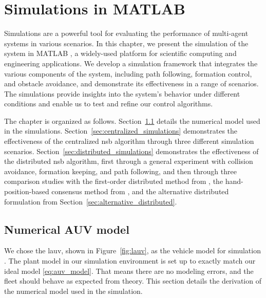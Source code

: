 \chapter{Simulations in MATLAB}\label{cha:sim_matlab}
Simulations are a powerful tool for evaluating the performance of multi-agent systems in various scenarios. In this chapter, we present the simulation of the system in MATLAB \citep{matlab_2022}, a widely-used platform for scientific computing and engineering applications. We develop a simulation framework that integrates the various components of the system, including path following, formation control, and obstacle avoidance, and demonstrate its effectiveness in a range of scenarios. The simulations provide insights into the system's behavior under different conditions and enable us to test and refine our control algorithms. 


The chapter is organized as follows. Section~\ref{sec:numerical_auv} details the numerical model used in the simulations. Section~\ref{sec:centralized_simulations} demonstrates the effectiveness of the centralized \gls{nsb} algorithm through three different simulation scenarios. Section~\ref{sec:distributed_simulations} demonstrates the effectiveness of the distributed \gls{nsb} algorithm, first through a general experiment with collision avoidance, formation keeping, and path following, and then through three comparison studies with the first-order distributed method from \cite{matous_formation_2023}, the hand-position-based consensus method from \cite{restrepo_tracking--formation_2022}, and the alternative distributed formulation from Section~\ref{sec:alternative_distributed}.

\section{Numerical AUV model}\label{sec:numerical_auv}
We chose the \gls{lauv}, shown in Figure~\ref{fig:lauv}, as the vehicle model for simulation \citep{sousa_lauv_2012}. The plant model in our simulation environment is set up to exactly match our ideal model \eqref{eq:auv_model}. That means there are no modeling errors, and the fleet should behave as expected from theory. This section details the derivation of the numerical model used in the simulation.

